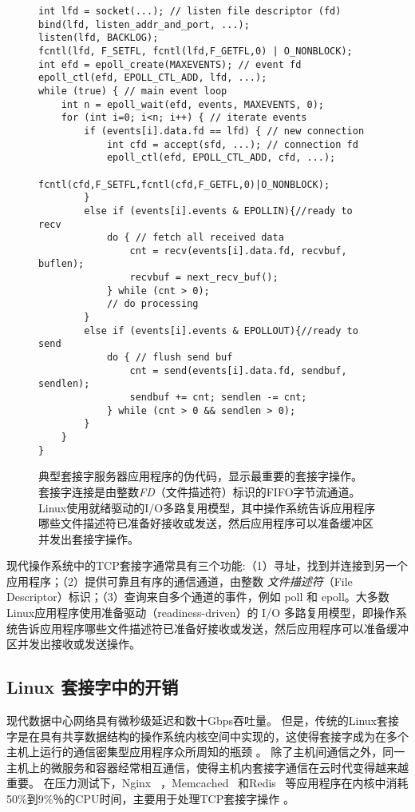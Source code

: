 \begin{figure}[htbp]
\small
\begin{lstlisting}[style=myCStyle]
int lfd = socket(...); // listen file descriptor (fd)
bind(lfd, listen_addr_and_port, ...);
listen(lfd, BACKLOG);
fcntl(lfd, F_SETFL, fcntl(lfd,F_GETFL,0) | O_NONBLOCK);
int efd = epoll_create(MAXEVENTS); // event fd
epoll_ctl(efd, EPOLL_CTL_ADD, lfd, ...);
while (true) { // main event loop
	int n = epoll_wait(efd, events, MAXEVENTS, 0);
	for (int i=0; i<n; i++) { // iterate events
		if (events[i].data.fd == lfd) { // new connection
			int cfd = accept(sfd, ...); // connection fd
			epoll_ctl(efd, EPOLL_CTL_ADD, cfd, ...);
			fcntl(cfd,F_SETFL,fcntl(cfd,F_GETFL,0)|O_NONBLOCK);
		}
		else if (events[i].events & EPOLLIN){//ready to recv
			do { // fetch all received data
				cnt = recv(events[i].data.fd, recvbuf, buflen);
				recvbuf = next_recv_buf();
			} while (cnt > 0);
			// do processing
		}
		else if (events[i].events & EPOLLOUT){//ready to send
			do { // flush send buf
				cnt = send(events[i].data.fd, sendbuf, sendlen);
				sendbuf += cnt; sendlen -= cnt;
			} while (cnt > 0 && sendlen > 0);
		}
	}
}
\end{lstlisting}

\caption{典型套接字服务器应用程序的伪代码，显示最重要的套接字操作。 套接字连接是由整数\emph {FD}（文件描述符）标识的FIFO字节流通道。 Linux使用就绪驱动的I/O多路复用模型，其中操作系统告诉应用程序哪些文件描述符已准备好接收或发送，然后应用程序可以准备缓冲区并发出套接字操作。}
\label{socksdirect:fig:socket-pseudo-code}
\end{figure}

现代操作系统中的TCP套接字通常具有三个功能:（1）寻址，找到并连接到另一个应用程序；（2）提供可靠且有序的通信通道，由整数 \emph {文件描述符}（File Descriptor）标识；（3）查询来自多个通道的事件，例如 poll 和 epoll。大多数Linux应用程序使用准备驱动（readiness-driven）的 I/O 多路复用模型，即操作系统告诉应用程序哪些文件描述符已准备好接收或发送，然后应用程序可以准备缓冲区并发出接收或发送操作。



\subsection{Linux 套接字中的开销}
\label{socksdirect:subsec:motivation}


现代数据中心网络具有微秒级延迟和数十Gbps吞吐量。 但是，传统的Linux套接字是在具有共享数据结构的操作系统内核空间中实现的，这使得套接字成为在多个主机上运行的通信密集型应用程序众所周知的瓶颈 \cite {barroso2017attack}。 除了主机间通信之外，同一主机上的微服务和容器经常相互通信，使得主机内套接字通信在云时代变得越来越重要。 在压力测试下，Nginx~ \cite {reese2008nginx}，Memcached~ \cite {fitzpatrick2004distributed} 和Redis~ \cite {carlson2013redis} 等应用程序在内核中消耗50\%到9\%％的CPU时间，主要用于处理TCP套接字操作 \cite{jeong2014mtcp}。

